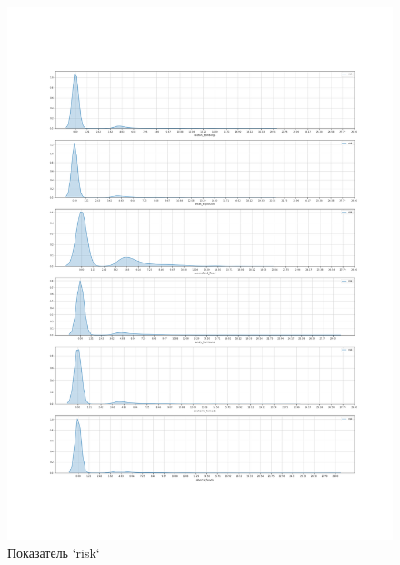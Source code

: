 \documentclass[11pt]{article}
\begin{document}
\begin{figure}
\centering
\includegraphics[width=\textwidth]{risk.png}
\caption{Показатель `risk`}\label{risk}
\end{figure}
\end{document}
